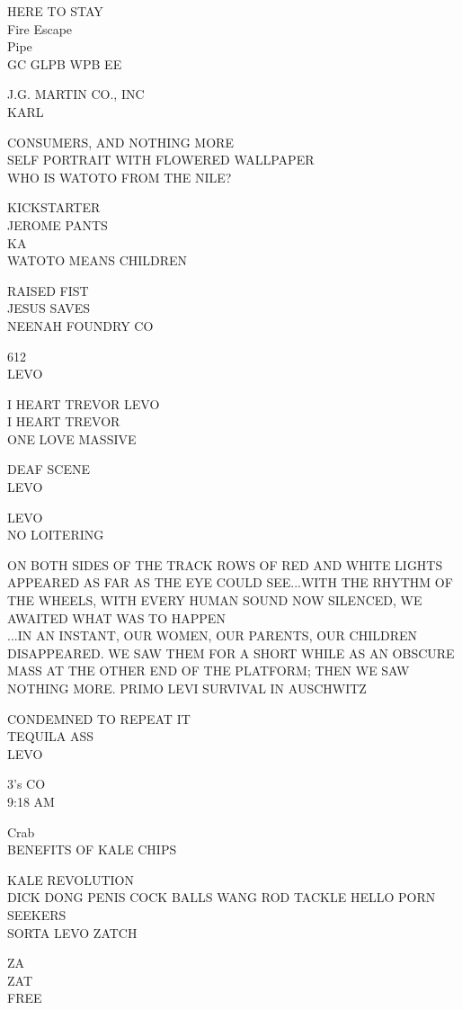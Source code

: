 \documentclass[10pt,letterpaper]{article}
\begin{document}
HERE TO STAY\\
Fire Escape\\
Pipe\\
GC GLPB WPB EE

J.G. MARTIN CO., INC\\
KARL

CONSUMERS, AND NOTHING MORE\\
SELF PORTRAIT WITH FLOWERED WALLPAPER\\
WHO IS WATOTO FROM THE NILE?

KICKSTARTER\\
JEROME PANTS\\
KA\\
WATOTO MEANS CHILDREN

RAISED FIST\\
JESUS SAVES\\
NEENAH FOUNDRY CO

612\\
LEVO

I HEART TREVOR LEVO\\
I HEART TREVOR\\
ONE LOVE MASSIVE

DEAF SCENE\\
LEVO

LEVO\\
NO LOITERING

ON BOTH SIDES OF THE TRACK ROWS OF RED AND WHITE LIGHTS APPEARED AS FAR AS THE EYE COULD SEE...WITH THE RHYTHM OF THE WHEELS, WITH EVERY HUMAN SOUND NOW SILENCED, WE AWAITED WHAT WAS TO HAPPEN\\
...IN AN INSTANT, OUR WOMEN, OUR PARENTS, OUR CHILDREN DISAPPEARED.  WE SAW THEM FOR A SHORT WHILE AS AN OBSCURE MASS AT THE OTHER END OF THE PLATFORM; THEN WE SAW NOTHING MORE.  PRIMO LEVI  SURVIVAL IN AUSCHWITZ

CONDEMNED TO REPEAT IT\\
TEQUILA ASS\\
LEVO

3's CO\\
9:18 AM

Crab\\
BENEFITS OF KALE CHIPS

KALE REVOLUTION\\
DICK DONG PENIS COCK BALLS WANG ROD TACKLE HELLO PORN SEEKERS\\
SORTA LEVO ZATCH

ZA\\
ZAT\\
FREE
\end{document}
